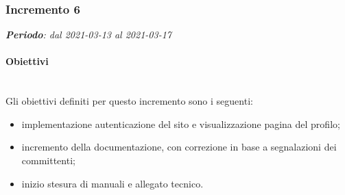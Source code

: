 \subsubsection{Incremento 6}
\textit{\textbf{Periodo}: dal 2021-03-13 al 2021-03-17}

\paragraph{Obiettivi}\\
Gli obiettivi definiti per questo incremento sono i seguenti:
\begin{itemize}
\item implementazione autenticazione del sito e visualizzazione pagina del profilo;
\item incremento della documentazione, con correzione in base a segnalazioni dei committenti;
\item inizio stesura di manuali e allegato tecnico.
\end{itemize}

